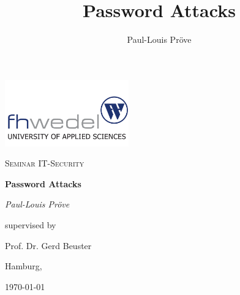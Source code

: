 \documentclass[11pt, a4paper]{article}
\title{Password Attacks}
\author{Paul-Louis Pröve}
\begin{document}
    \begin{titlepage}
    \centering
    \includegraphics[width=0.4\textwidth]{fhw.png}\par
    \vspace{1cm}
    {\scshape\Large Seminar IT-Security\par}
    \vspace{2cm}
    {\bfseries\Huge Password Attacks\par}
    \vspace{2cm}
    {\itshape\Large Paul-Louis Pröve\par}
    \vfill
    supervised by\par
    Prof. Dr. Gerd Beuster\par
    \vspace{1cm}
    Hamburg,\par \today\par
    \end{titlepage}

\tableofcontents
\newpage











\end{document}
